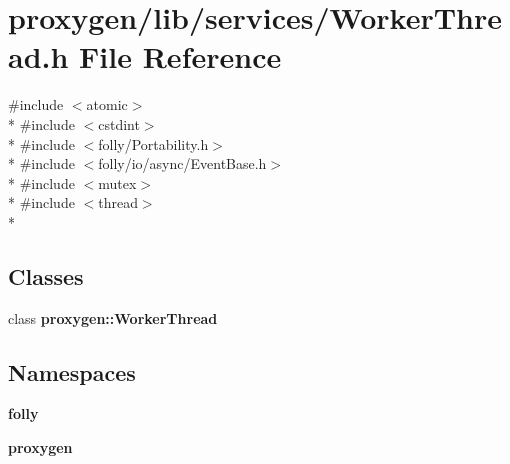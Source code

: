 \section{proxygen/lib/services/\+Worker\+Thread.h File Reference}
\label{WorkerThread_8h}
{\ttfamily \#include $<$atomic$>$}\\*
{\ttfamily \#include $<$cstdint$>$}\\*
{\ttfamily \#include $<$folly/\+Portability.\+h$>$}\\*
{\ttfamily \#include $<$folly/io/async/\+Event\+Base.\+h$>$}\\*
{\ttfamily \#include $<$mutex$>$}\\*
{\ttfamily \#include $<$thread$>$}\\*
\subsection*{Classes}
\begin{DoxyCompactItemize}
\item 
class {\bf proxygen\+::\+Worker\+Thread}
\end{DoxyCompactItemize}
\subsection*{Namespaces}
\begin{DoxyCompactItemize}
\item 
 {\bf folly}
\item 
 {\bf proxygen}
\end{DoxyCompactItemize}
